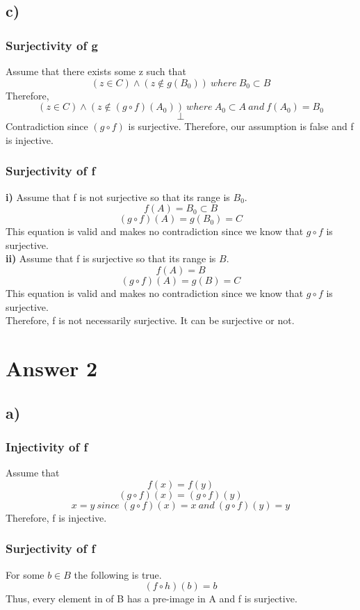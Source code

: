 \documentclass[12pt]{article}
\begin{document}
\subsection*{c)}
\subsubsection*{Surjectivity of g}
Assume that there exists some z such that 
$$(z \in C) \wedge (z \notin g(B_0)) \ where \ B_0 \subset B$$
Therefore,
$$(z \in C) \wedge (z \notin (g\circ f)(A_0)) \ where \ A_0 \subset A \ and\ f(A_0)=B_0$$
$$\perp$$
Contradiction since $(g\circ f)$ is surjective. Therefore, our assumption is false and f is injective.
\subsubsection*{Surjectivity of f}
\textbf{i)} Assume that f is not surjective so that its range is $B_0$.
$$f(A)=B_0 \subset B$$
$$(g \circ f)(A)=g(B_0)=C$$
This equation is valid and makes no contradiction since we know that $g\circ f$ is surjective.\\
\textbf{ii)} Assume that f is surjective so that its range is $B$.
$$f(A)=B$$
$$(g \circ f)(A)=g(B)=C$$
This equation is valid and makes no contradiction since we know that $g\circ f$ is surjective.\\
Therefore, f is not necessarily surjective. It can be surjective or not.

\section*{Answer 2}

\subsection*{a)}
\subsubsection*{Injectivity of f}
Assume that
$$f(x)=f(y)$$
$$(g\circ f)(x)=(g\circ f)(y)$$
$$x=y\ since\ (g\circ f)(x)=x\ and\ (g\circ f)(y)=y$$
Therefore, f is injective.
\subsubsection*{Surjectivity of f}
For some $b \in B$ the following is true.
$$(f\circ h)(b)=b$$
Thus, every element in of B has a pre-image in A and f is surjective.
\end{document}
